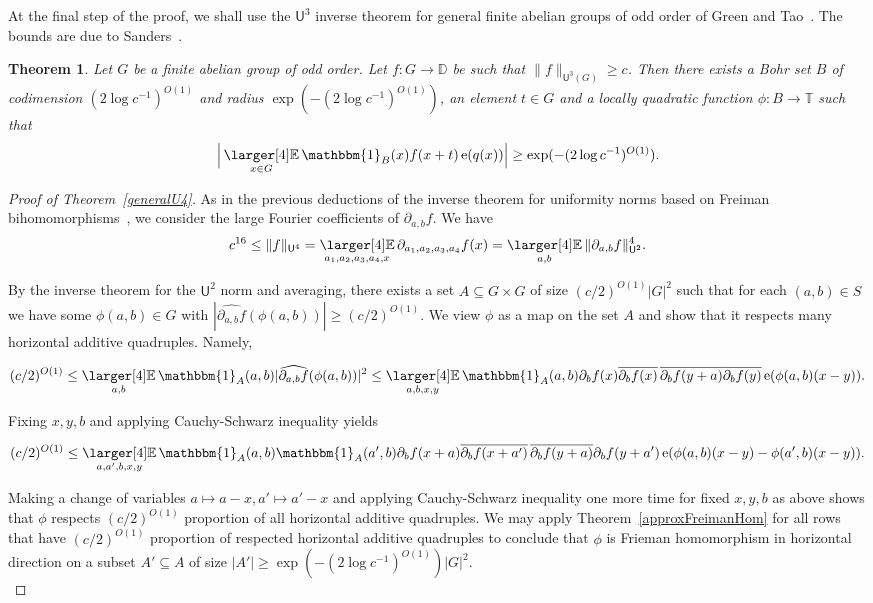 \documentclass[a4paper,11pt]{article}
\newtheorem{theorem}{Theorem}
\numberwithin{theorem}{section}
\theoremstyle{definition}
\newcommand\id{\mathbbm{1}}
\newcommand{\on}[1]{
	\operatorname{#1}
}
\newcommand{\exx}{
  \mathop{
    \mathchoice{\vcenter{\hbox{\larger[4]$\mathbb{E}$}}}
               {\kern0pt\mathbb{E}}
               {\kern0pt\mathbb{E}}
               {\kern0pt\mathbb{E}}
  }\displaylimits
}
\begin{document}
At the final step of the proof, we shall use the $\mathsf{U}^3$ inverse theorem for general finite abelian groups of odd order of Green and Tao~\cite{GreenTaoU3}. The bounds are due to Sanders~\cite{Sanders}.

\begin{theorem}\label{greentaou3inversethm}
    Let $G$ be a finite abelian group of odd order. Let $f : G \to \mathbb{D}$ be such that $\|f\|_{\mathsf{U}^3(G)} \geq c$. Then there exists a Bohr set $B$ of codimension $(2 \log c^{-1})^{O(1)}$ and radius $\exp(-(2 \log c^{-1})^{O(1)})$, an element $t \in G$ and a locally quadratic function $\phi : B \to \mathbb{T}$ such that 
    \[\Big|\exx_{x \in G} \id_{B}(x) f(x + t) \on{e}(q(x))\Big| \geq \exp(-(2 \log c^{-1})^{O(1)}).\]
\end{theorem}

\begin{proof}[Proof of Theorem~\ref{generalU4}]
    As in the previous deductions of the inverse theorem for uniformity norms based on Freiman bihomomorphisms~\cite{U4paper,newU4}, we consider the large Fourier coefficients of $\partial_{a, b} f$. We have
    \[c^{16} \leq \|f\|_{\mathsf{U}^4}  = \exx_{a_1, a_2, a_3 ,a_4, x} \partial_{a_1, a_2, a_3, a_4} f(x) = \exx_{a,b} \|\partial_{a,b} f\|_{\mathsf{U}^2}^4.\]

    By the inverse theorem for the $\mathsf{U}^2$ norm and averaging, there exists a set $A \subseteq G \times G$ of size $(c/2)^{O(1)}|G|^2$ such that for each $(a,b) \in S$ we have some $\phi(a,b) \in \hat{G}$ with $|\widehat{\partial_{a,b} f}(\phi(a,b))| \geq (c/2)^{O(1)}$. We view $\phi$ as a map on the set $A$ and show that it respects many horizontal additive quadruples. Namely,

    \[(c/2)^{O(1)} \leq \exx_{a,b} \id_A(a,b)|\widehat{\partial_{a,b} f}(\phi(a,b))|^2
    \leq \exx_{a,b,x,y} \id_A(a,b)\partial_bf(x) \overline{\partial_{b} f(x)}\, \overline{\partial_{b} f(y + a)} \overline{\partial_{b} f(y)} \on{e}(\phi(a, b)(x - y)).\]

    Fixing $x,y,b$ and applying Cauchy-Schwarz inequality yields

    \[(c/2)^{O(1)} \leq \exx_{a,a', b,x,y} \id_A(a,b) \id_A(a',b)\partial_bf(x +a ) \overline{\partial_{b} f(x + a')}\, \overline{\partial_{b} f(y + a)} \partial_{b} f(y + a') \on{e}(\phi(a, b)(x - y) - \phi(a', b)(x - y)).\]

    Making a change of variables $a \mapsto a - x, a' \mapsto a'-x$ and applying Cauchy-Schwarz inequality one more time for fixed $x,y, b$ as above shows that $\phi$ respects $(c/2)^{O(1)}$ proportion of all horizontal additive quadruples. We may apply Theorem~\ref{approxFreimanHom} for all rows that have $(c/2)^{O(1)}$ proportion of respected horizontal additive quadruples to conclude that $\phi$ is Frieman homomorphism in horizontal direction on a subset $A' \subseteq A$ of size $|A'| \geq \exp(-(2 \log c^{-1})^{O(1)}) |G|^2$.\\


\end{proof}
\end{document}
